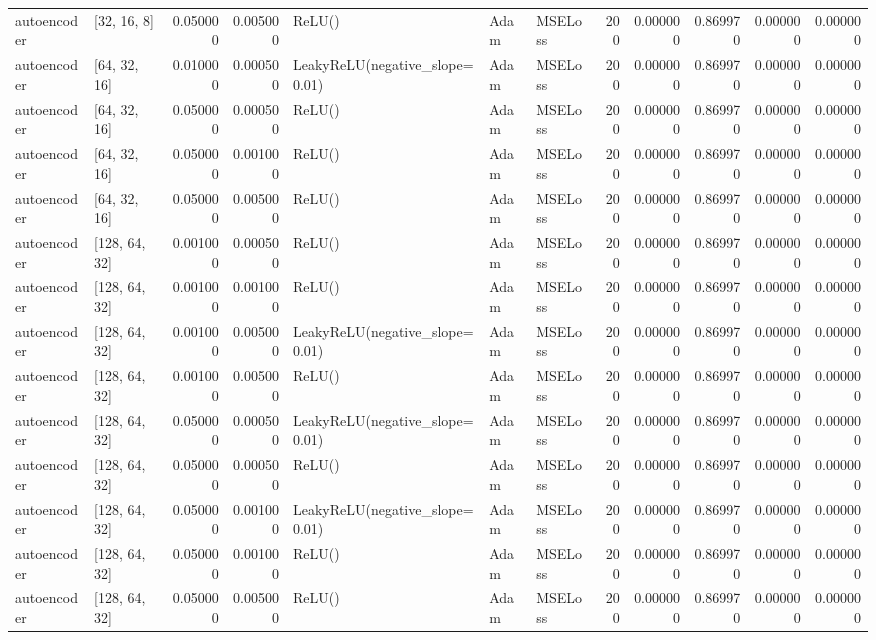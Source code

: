 \documentclass[10pt,twocolumn,letterpaper]{article}
\begin{document}
\begin{appendices}
{\begin{center}
\begin{tabular}{llrrlllrrrrr}
      autoencoder & [32, 16, 8] & 0.050000 & 0.005000 & ReLU() & Adam & MSELoss & 200 & 0.000000 & 0.869970 & 0.000000 & 0.000000 \\
      autoencoder & [64, 32, 16] & 0.010000 & 0.000500 & LeakyReLU(negative\_slope=0.01) & Adam & MSELoss & 200 & 0.000000 & 0.869970 & 0.000000 & 0.000000 \\
      autoencoder & [64, 32, 16] & 0.050000 & 0.000500 & ReLU() & Adam & MSELoss & 200 & 0.000000 & 0.869970 & 0.000000 & 0.000000 \\
      autoencoder & [64, 32, 16] & 0.050000 & 0.001000 & ReLU() & Adam & MSELoss & 200 & 0.000000 & 0.869970 & 0.000000 & 0.000000 \\
      autoencoder & [64, 32, 16] & 0.050000 & 0.005000 & ReLU() & Adam & MSELoss & 200 & 0.000000 & 0.869970 & 0.000000 & 0.000000 \\
      autoencoder & [128, 64, 32] & 0.001000 & 0.000500 & ReLU() & Adam & MSELoss & 200 & 0.000000 & 0.869970 & 0.000000 & 0.000000 \\
      autoencoder & [128, 64, 32] & 0.001000 & 0.001000 & ReLU() & Adam & MSELoss & 200 & 0.000000 & 0.869970 & 0.000000 & 0.000000 \\
      autoencoder & [128, 64, 32] & 0.001000 & 0.005000 & LeakyReLU(negative\_slope=0.01) & Adam & MSELoss & 200 & 0.000000 & 0.869970 & 0.000000 & 0.000000 \\
      autoencoder & [128, 64, 32] & 0.001000 & 0.005000 & ReLU() & Adam & MSELoss & 200 & 0.000000 & 0.869970 & 0.000000 & 0.000000 \\
      autoencoder & [128, 64, 32] & 0.050000 & 0.000500 & LeakyReLU(negative\_slope=0.01) & Adam & MSELoss & 200 & 0.000000 & 0.869970 & 0.000000 & 0.000000 \\
      autoencoder & [128, 64, 32] & 0.050000 & 0.000500 & ReLU() & Adam & MSELoss & 200 & 0.000000 & 0.869970 & 0.000000 & 0.000000 \\
      autoencoder & [128, 64, 32] & 0.050000 & 0.001000 & LeakyReLU(negative\_slope=0.01) & Adam & MSELoss & 200 & 0.000000 & 0.869970 & 0.000000 & 0.000000 \\
      autoencoder & [128, 64, 32] & 0.050000 & 0.001000 & ReLU() & Adam & MSELoss & 200 & 0.000000 & 0.869970 & 0.000000 & 0.000000 \\
      autoencoder & [128, 64, 32] & 0.050000 & 0.005000 & ReLU() & Adam & MSELoss & 200 & 0.000000 & 0.869970 & 0.000000 & 0.000000 \\
      \end{tabular}
   \end{center}

}
\end{appendices}
\end{document}
